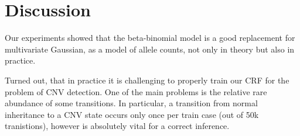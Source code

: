 \section{Discussion}
Our experiments showed that the beta-binomial model is a good replacement for multivariate Gaussian, as a model of allele counts, not only in theory but also in practice.

Turned out, that in practice it is challenging to properly train our CRF for the problem of CNV detection. One of the main problems is the relative rare abundance of some transitions. In particular, a transition from normal inheritance to a CNV state occurs only once per train case (out of \ntilde 50k tranistions), however is absolutely vital for a correct inference. 